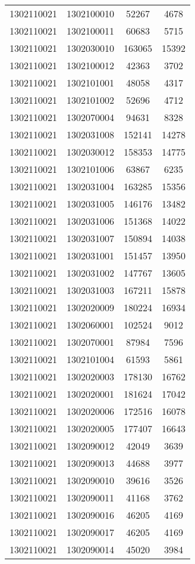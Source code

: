 \begin{longtable}{llcc}
1302110021 & 1302100010 & 52267 & 4678\\
1302110021 & 1302100011 & 60683 & 5715\\
1302110021 & 1302030010 & 163065 & 15392\\
1302110021 & 1302100012 & 42363 & 3702\\
1302110021 & 1302101001 & 48058 & 4317\\
1302110021 & 1302101002 & 52696 & 4712\\
1302110021 & 1302070004 & 94631 & 8328\\
1302110021 & 1302031008 & 152141 & 14278\\
1302110021 & 1302030012 & 158353 & 14775\\
1302110021 & 1302101006 & 63867 & 6235\\
1302110021 & 1302031004 & 163285 & 15356\\
1302110021 & 1302031005 & 146176 & 13482\\
1302110021 & 1302031006 & 151368 & 14022\\
1302110021 & 1302031007 & 150894 & 14038\\
1302110021 & 1302031001 & 151457 & 13950\\
1302110021 & 1302031002 & 147767 & 13605\\
1302110021 & 1302031003 & 167211 & 15878\\
1302110021 & 1302020009 & 180224 & 16934\\
1302110021 & 1302060001 & 102524 & 9012\\
1302110021 & 1302070001 & 87984 & 7596\\
1302110021 & 1302101004 & 61593 & 5861\\
1302110021 & 1302020003 & 178130 & 16762\\
1302110021 & 1302020001 & 181624 & 17042\\
1302110021 & 1302020006 & 172516 & 16078\\
1302110021 & 1302020005 & 177407 & 16643\\
1302110021 & 1302090012 & 42049 & 3639\\
1302110021 & 1302090013 & 44688 & 3977\\
1302110021 & 1302090010 & 39616 & 3526\\
1302110021 & 1302090011 & 41168 & 3762\\
1302110021 & 1302090016 & 46205 & 4169\\
1302110021 & 1302090017 & 46205 & 4169\\
1302110021 & 1302090014 & 45020 & 3984\\

\end{longtable}
